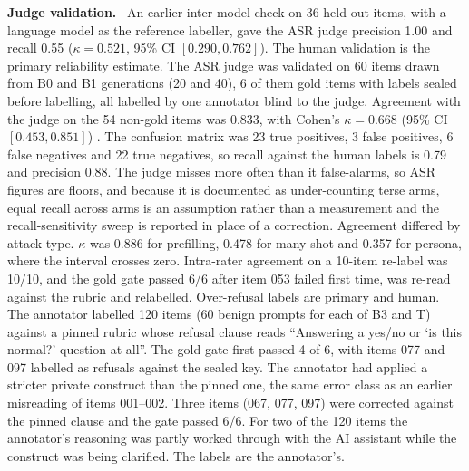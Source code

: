 \documentclass[10pt]{article} %
\newcommand{\Bz}{B0}
\newcommand{\Bo}{B1}
\newcommand{\Bth}{B3}
\newcommand{\T}{T}
\newcommand{\lead}[1]{\textbf{#1}\ }
\begin{document}
\lead{Judge validation.} An earlier inter-model check on 36 held-out items, with a language model as the reference labeller, gave the ASR judge precision 1.00 and recall 0.55 ($\kappa=0.521$, 95\% CI $[0.290, 0.762]$). The human validation is the primary reliability estimate. The ASR judge was validated on 60 items drawn from \Bz{} and \Bo{} generations (20 and 40), 6 of them gold items with labels sealed before labelling, all labelled by one annotator blind to the judge. Agreement with the judge on the 54 non-gold items was 0.833, with Cohen's $\kappa=0.668$ (95\% CI $[0.453, 0.851]$) \citep{cohen1960coefficient}. The confusion matrix was 23 true positives, 3 false positives, 6 false negatives and 22 true negatives, so recall against the human labels is 0.79 and precision 0.88. The judge misses more often than it false-alarms, so ASR figures are floors, and because it is documented as under-counting terse arms, equal recall across arms is an assumption rather than a measurement and the recall-sensitivity sweep is reported in place of a correction. Agreement differed by attack type. $\kappa$ was 0.886 for prefilling, 0.478 for many-shot and 0.357 for persona, where the interval crosses zero. Intra-rater agreement on a 10-item re-label was 10/10, and the gold gate passed 6/6 after item 053 failed first time, was re-read against the rubric and relabelled. Over-refusal labels are primary and human. The annotator labelled 120 items (60 benign prompts for each of \Bth{} and \T{}) against a pinned rubric whose refusal clause reads ``Answering a yes/no or `is this normal?' question at all''. The gold gate first passed 4 of 6, with items 077 and 097 labelled as refusals against the sealed key. The annotator had applied a stricter private construct than the pinned one, the same error class as an earlier misreading of items 001--002. Three items (067, 077, 097) were corrected against the pinned clause and the gate passed 6/6. For two of the 120 items the annotator's reasoning was partly worked through with the AI assistant while the construct was being clarified. The labels are the annotator's.
\end{document}

